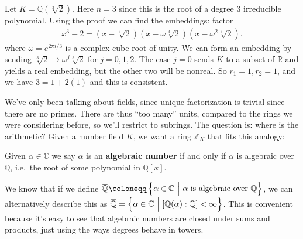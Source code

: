 \begin{example}[?]

Let \(K = {\mathbb{Q}}(\sqrt[3]{2})\). Here \(n=3\) since this is the
root of a degree 3 irreducible polynomial. Using the proof we can find
the embeddings: factor
\begin{align*}
x^3 - 2 = (x - \sqrt[3]{2})(x - \omega \sqrt[3]{2}) (x - \omega^2 \sqrt[3]{2})
.\end{align*}
where \(\omega = e^{2\pi i / 3}\) is a complex cube root of unity. We
can form an embedding by sending
\(\sqrt[3]{2} \to \omega^j \sqrt[3]{2}\) for \(j=0,1,2\). The case
\(j=0\) sends \(K\) to a subset of \({\mathbb{R}}\) and yields a real
embedding, but the other two will be nonreal. So \(r_1 = 1, r_2 = 1\),
and we have \(3 = 1 + 2(1)\) and this is consistent.

\end{example}

\begin{remark}

We've only been talking about fields, since unique factorization is
trivial since there are no primes. There are thus ``too many'' units,
compared to the rings we were considering before, so we'll restrict to
subrings. The question is: where is the arithmetic? Given a number field
\(K\), we want a ring \({\mathbb{Z}}_K\) that fits this analogy:

\begin{center}
\end{center}

\end{remark}

\begin{definition}

Given \(\alpha\in {\mathbb{C}}\) we say \(\alpha\) is an
\textbf{algebraic number} if and only if \(\alpha\) is algebraic over
\({\mathbb{Q}}\), i.e.~the root of some polynomial in
\({\mathbb{Q}}[x]\).

\end{definition}

\begin{remark}

We know that if we define
\(\mkern 1.5mu\overline{\mkern-1.5mu{\mathbb{Q}}\mkern-1.5mu}\mkern 1.5mu\coloneqq\left\{{\alpha\in {\mathbb{C}}{~\mathrel{\Big|}~}\alpha \text{ is algebraic over } {\mathbb{Q}}}\right\}\),
we can alternatively describe this as
\(\mkern 1.5mu\overline{\mkern-1.5mu{\mathbb{Q}}\mkern-1.5mu}\mkern 1.5mu= \left\{{ \alpha\in {\mathbb{C}}{~\mathrel{\Big|}~}[{\mathbb{Q}}(\alpha) : {\mathbb{Q}}] < \infty }\right\}\).
This is convenient because it's easy to see that algebraic numbers are
closed under sums and products, just using the ways degrees behave in
towers.

\end{remark}

